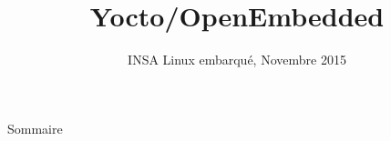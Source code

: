 \documentclass{beamer}
\title[Yocto/OpenEmbedded]
{Yocto/OpenEmbedded}
\date[Novembre 2015]
{INSA Linux embarqué, Novembre 2015}
\begin{document}
\begin{frame}
  \titlepage
\end{frame}

\begin{frame}{Sommaire}
  \tableofcontents
\end{frame}


\end{document}
